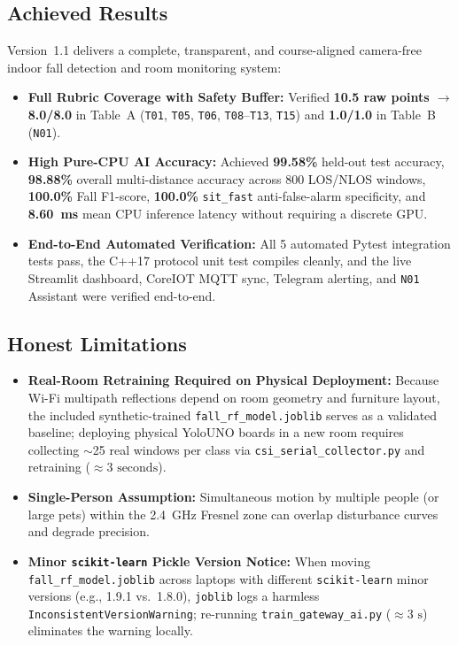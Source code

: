 \documentclass{hcmut-report}
\begin{document}
\subsection{Achieved Results}
Version~1.1 delivers a complete, transparent, and course-aligned camera-free indoor fall detection and room monitoring system:
\begin{itemize}
  \item \textbf{Full Rubric Coverage with Safety Buffer:} Verified \textbf{10.5 raw points $\rightarrow$ 8.0/8.0} in Table~A (\texttt{T01}, \texttt{T05}, \texttt{T06}, \texttt{T08}--\texttt{T13}, \texttt{T15}) and \textbf{1.0/1.0} in Table~B (\texttt{N01}).
  \item \textbf{High Pure-CPU AI Accuracy:} Achieved \textbf{99.58\%} held-out test accuracy, \textbf{98.88\%} overall multi-distance accuracy across 800 LOS/NLOS windows, \textbf{100.0\%} Fall F1-score, \textbf{100.0\%} \texttt{sit\_fast} anti-false-alarm specificity, and \textbf{8.60~ms} mean CPU inference latency without requiring a discrete GPU.
  \item \textbf{End-to-End Automated Verification:} All 5 automated Pytest integration tests pass, the C++17 protocol unit test compiles cleanly, and the live Streamlit dashboard, CoreIOT MQTT sync, Telegram alerting, and \texttt{N01} Assistant were verified end-to-end.
\end{itemize}

\subsection{Honest Limitations}
\begin{itemize}
  \item \textbf{Real-Room Retraining Required on Physical Deployment:} Because Wi-Fi multipath reflections depend on room geometry and furniture layout, the included synthetic-trained \texttt{fall\_rf\_model.joblib} serves as a validated baseline; deploying physical YoloUNO boards in a new room requires collecting $\sim$25 real windows per class via \texttt{csi\_serial\_collector.py} and retraining ($\approx 3\text{ seconds}$).
  \item \textbf{Single-Person Assumption:} Simultaneous motion by multiple people (or large pets) within the 2.4~GHz Fresnel zone can overlap disturbance curves and degrade precision.
  \item \textbf{Minor \texttt{scikit-learn} Pickle Version Notice:} When moving \texttt{fall\_rf\_model.joblib} across laptops with different \texttt{scikit-learn} minor versions (e.g., 1.9.1 vs.\ 1.8.0), \texttt{joblib} logs a harmless \texttt{InconsistentVersionWarning}; re-running \texttt{train\_gateway\_ai.py} ($\approx 3\text{ s}$) eliminates the warning locally.
\end{itemize}
\end{document}
